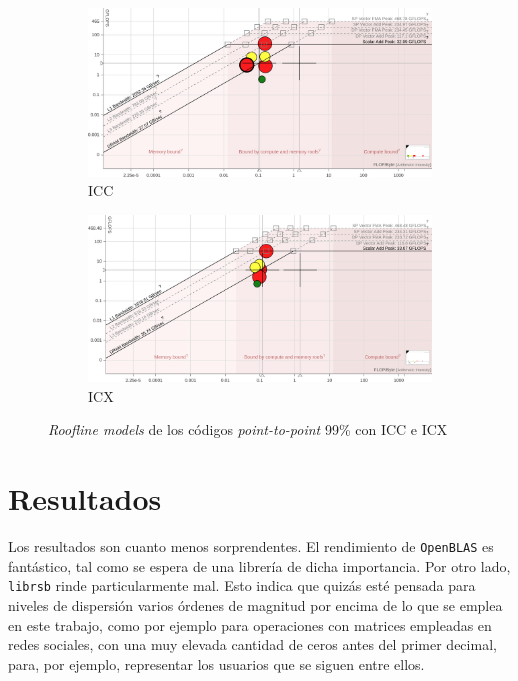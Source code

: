 \begin{figure}[htpb]
    \centering
    \begin{subfigure}[b]{0.495\textwidth}
        \includegraphics[width=\textwidth]{img/rooflines/roofline_p2p_99_icc.png}
        \caption{ICC}
        \label{fig:roofline_p2p_icc_99}
    \end{subfigure}
    \begin{subfigure}[b]{0.495\textwidth}
        \includegraphics[width=\textwidth]{img/rooflines/roofline_p2p_99_icx.png}
        \caption{ICX}
        \label{fig:roofline_p2p_icx_99}
    \end{subfigure}

    \caption{\textit{Roofline models} de los códigos \textit{point-to-point} 99\% con ICC e ICX}
    \label{fig:rooflines_p2p_icc_icx_99}
\end{figure}

\section{Resultados}
Los resultados son cuanto menos sorprendentes. El rendimiento de \texttt{OpenBLAS} es fantástico, tal como se espera de una librería de dicha importancia. Por otro lado, \texttt{librsb} rinde particularmente mal. Esto indica que quizás esté pensada para niveles de dispersión varios órdenes de magnitud por encima de lo que se emplea en este trabajo, como por ejemplo para operaciones con matrices empleadas en redes sociales, con una muy elevada cantidad de ceros antes del primer decimal, para, por ejemplo, representar los usuarios que se siguen entre ellos.

